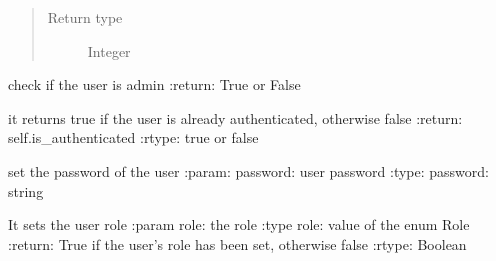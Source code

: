 \documentclass[letterpaper,10pt,english]{sphinxmanual}
\begin{document}
\begin{fulllineitems}
\begin{fulllineitems}
\begin{quote}
\begin{description}
\item[{Return type}] \leavevmode
Integer

\end{description}\end{quote}

\end{fulllineitems}


\begin{fulllineitems}
\label{\detokenize{index:model.gio_db.User.is_admin}}
check if the user is admin
:return: True or False

\end{fulllineitems}


\begin{fulllineitems}
\label{\detokenize{index:model.gio_db.User.is_authenticated}}
it returns true if the user is already authenticated, otherwise false
:return: self.is\_authenticated
:rtype: true or false

\end{fulllineitems}


\begin{fulllineitems}
\label{\detokenize{index:model.gio_db.User.set_password}}
set the password of the user
:param: password: user password
:type: password: string

\end{fulllineitems}


\begin{fulllineitems}
\label{\detokenize{index:model.gio_db.User.set_role}}
It sets the user role
:param role: the role
:type role: value of the enum Role
:return: True if the user’s role has been set, otherwise false
:rtype: Boolean


\end{fulllineitems}
\end{fulllineitems}
\end{document}
